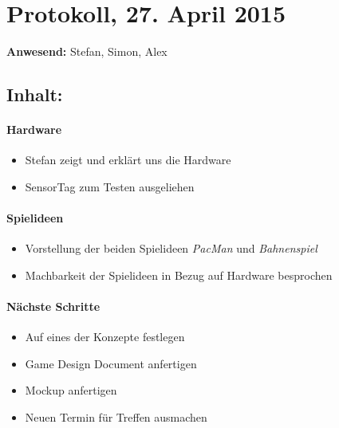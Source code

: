 \documentclass[a4paper,11pt]{article}
\begin{document}
\section*{Protokoll, 27. April 2015}

\textbf{Anwesend:} Stefan, Simon, Alex

\subsection*{Inhalt:}

\paragraph{Hardware}
\begin{itemize}
  \item Stefan zeigt und erklärt uns die Hardware
  \item SensorTag zum Testen ausgeliehen
\end{itemize}
\paragraph{Spielideen}
\begin{itemize}
  \item Vorstellung der beiden Spielideen \textit{PacMan} und \textit{Bahnenspiel}
  \item Machbarkeit der Spielideen in Bezug auf Hardware besprochen
\end{itemize}

\paragraph{Nächste Schritte}
\begin{itemize}
  \item Auf eines der Konzepte festlegen
  \item Game Design Document anfertigen
  \item Mockup anfertigen
  \item Neuen Termin für Treffen ausmachen
\end{itemize}
\end{document}
